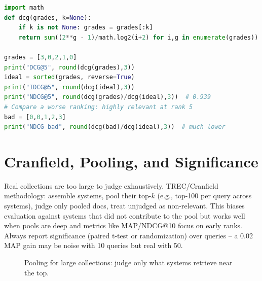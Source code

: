 \begin{lstlisting}[language=Python, caption={DCG and NDCG with the exponential gain.}, label={lst:ndcg}]
import math
def dcg(grades, k=None):
    if k is not None: grades = grades[:k]
    return sum((2**g - 1)/math.log2(i+2) for i,g in enumerate(grades))

grades = [3,0,2,1,0]
print("DCG@5", round(dcg(grades),3))
ideal = sorted(grades, reverse=True)
print("IDCG@5", round(dcg(ideal),3))
print("NDCG@5", round(dcg(grades)/dcg(ideal),3))  # 0.939
# Compare a worse ranking: highly relevant at rank 5
bad = [0,0,1,2,3]
print("NDCG bad", round(dcg(bad)/dcg(ideal),3))  # much lower
\end{lstlisting}

\section{Cranfield, Pooling, and Significance}\label{sec:cranfield}
Real collections are too large to judge exhaustively. TREC/Cranfield methodology: assemble systems, pool their top-$k$ (e.g., top-100 per query across systems), judge only pooled docs, treat unjudged as non-relevant. This biases evaluation against systems that did not contribute to the pool but works well when pools are deep and metrics like MAP/NDCG@10 focus on early ranks. Always report significance (paired t-test or randomization) over queries -- a 0.02 MAP gain may be noise with 10 queries but real with 50.

\begin{figure}[h]\centering
{}
\caption{Pooling for large collections: judge only what systems retrieve near the top.}
\label{fig:pooling}
\end{figure}

